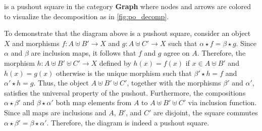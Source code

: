 \begin{example}
\begin{center}
{
    }
\end{center}
     is a pushout square in the category \textbf{Graph} where nodes and arrows are colored to visualize the decomposition as in \autoref{fig:po_decomp}.
\end{example}

To demonstrate that the diagram above is a pushout square, consider an object \( X \) and morphisms \( f: A \uplus B' \to X \) and \( g: A \uplus C' \to X \) such that \( \alpha \star f = \beta \star g \). Since \( \alpha \) and \( \beta \) are inclusion maps, it follows that \( f \) and \( g \) agree on \( A \). Therefore, the morphism \( h: A \uplus B' \uplus C' \to X \) defined by $h(x) = f(x)$ if $x\in A\uplus B'$ and $h(x) = g(x)$ otherwise is the unique morphism such that $\beta' \star h = f$ and $\alpha' \star h = g$. Thus, the object \( A \uplus B' \uplus C' \), together with the morphisms \( \beta' \) and \( \alpha' \), satisfies the universal property of the pushout. Furthermore, the compositions \( \alpha \star \beta'\) and \( \beta \star \alpha'\) both map elements from \( A \) to \( A \uplus B' \uplus C' \) via inclusion function.
Since all maps are inclusions and \( A \), \( B' \), and \( C' \) are disjoint, the square commutes $
     \alpha \star \beta' = \beta \star \alpha'
$. Therefore, the diagram is indeed a pushout square.
